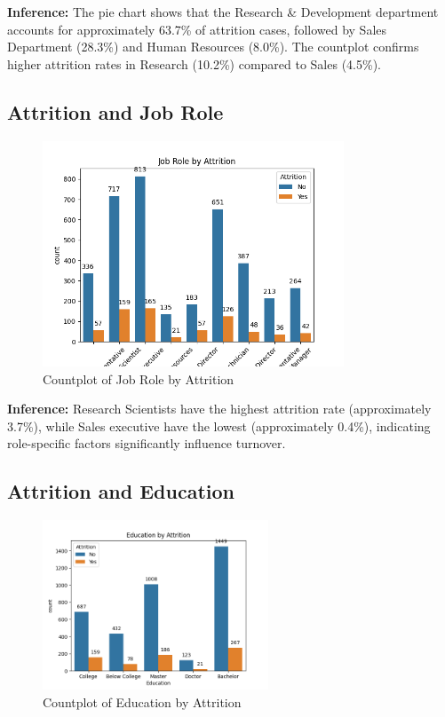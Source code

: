\documentclass[12pt, a4paper]{article}
\begin{document}
\textbf{Inference:} The pie chart shows that the Research \& Development department accounts for approximately 63.7\% of attrition cases, followed by Sales Department (28.3\%) and Human Resources (8.0\%). The countplot confirms higher attrition rates in Research (10.2\%) compared to Sales (4.5\%).

\subsection{Attrition and Job Role}
\begin{figure}[H]
    \centering
    \includegraphics[width=0.8\textwidth]{plots/attrition_jobrole_countplot.png}
    \caption{Countplot of Job Role by Attrition}
    \label{fig:attrition_jobrole}
\end{figure}

\textbf{Inference:} Research Scientists have the highest attrition rate (approximately 3.7\%), while Sales executive have the lowest (approximately 0.4\%), indicating role-specific factors significantly influence turnover.

\subsection{Attrition and Education}
\begin{figure}[H]
    \centering
    \includegraphics[width=0.6\textwidth]{plots/attrition_education_countplot.png}
    \caption{Countplot of Education by Attrition}
    \label{fig:attrition_education}
\end{figure}
\end{document}
